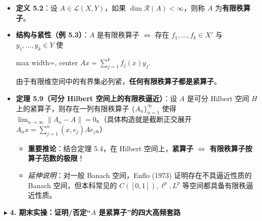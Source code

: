 \documentclass[11pt,a4paper]{article}
\providecommand{\tightlist}{\setlength{\itemsep}{1.8pt}\setlength{\parskip}{0pt}}
\newcommand{\SubSubHeading}[1]{%
  \Needspace{6.5\baselineskip}\vspace{5.5pt}\noindent
  \textcolor{AccentMain}{\scriptsize$\blacktriangleright$}\hspace{4pt}%
  {\small\bfseries\color{AccentMain}#1}\par\nopagebreak[4]\vspace{2.5pt}%
}
\newcommand{\FitDisplayMath}[1]{%
  \par\vspace{4pt}\noindent
  \begin{adjustbox}{max width=\linewidth, center}
    $\displaystyle #1$
  \end{adjustbox}
  \par\vspace{4pt}%
}
\begin{document}
\begin{itemize}
\tightlist
\item
  \textbf{定义 5.2}：设 \(A \in \mathcal{L}(X, Y)\)，如果 \(\dim \mathcal{R}(A) < \infty\)，则称 \(A\) 为\textbf{有限秩算子}。
\item
  \textbf{结构与紧性（例 5.3）}：\(A\) 是有限秩算子 \(\iff\) 存在 \(f_1, \dots, f_k \in X'\) 与 \(y_1, \dots, y_k \in Y\) 使 
\FitDisplayMath{Ax = \sum_{j=1}^k f_j(x) y_j.}
 由于有限维空间中的有界集必列紧，\textbf{任何有限秩算子都是紧算子}。
\item
  \textbf{定理 5.9（可分 Hilbert 空间上的有限秩逼近）}：设 \(A\) 是可分 Hilbert 空间 \(H\) 上的紧算子，则存在一列有限秩算子 \(\{A_n\}_{n=1}^\infty\) 使得 \(\lim_{n\to\infty} \|A_n - A\| = 0\)。（具体构造就是截断正交展开 \(A_n x = \sum_{j=1}^n (x, e_j) A e_j\)。）

  \begin{itemize}
  \tightlist
  \item
    \textbf{重要推论}：结合定理 5.4，在 Hilbert 空间上，\textbf{紧算子 \(\iff\) 有限秩算子按算子范数的极限}！
  \item
    \emph{延伸说明}：对一般 Banach 空间，Enflo (1973) 证明存在不具逼近性质的 Banach 空间，但本科常见的 \(C([0,1]), \ell^p, L^p\) 等空间都具备有限秩逼近性质。
  \end{itemize}
\end{itemize}

\SubSubHeading{4. 期末实操：证明/否定``\(A\) 是紧算子''的四大高频套路}
\end{document}
